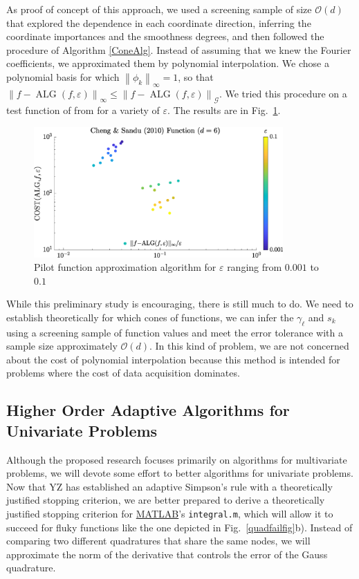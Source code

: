 \documentclass[11pt]{NSFamsart}
\newcommand{\MATLAB}{\hyperlink{MATLABlink}{MATLAB}\xspace}
\DeclareMathOperator{\ALG}{ALG}
\newcommand{\calg}{{\mathcal{G}}}
\newcommand{\norm}[2][{}]{\ensuremath{\left \lVert #2 \right \rVert}_{#1}}
\newcommand{\Order}{\mathcal{O}}
\begin{document}
As proof of concept of this approach, we used a screening sample of size $\Order(d)$ that  explored the dependence in each coordinate direction, inferring the coordinate importances and the smoothness degrees, and then followed the procedure of Algorithm \ref{ConeAlg}.  Instead of assuming that we knew the Fourier coefficients, we approximated them by polynomial interpolation.  We chose a polynomial basis for which $\norm[\infty]{\phi_k} = 1$, so that $\norm[\infty]{f - \ALG(f,\varepsilon)} \le \norm[\calg]{f - \ALG(f,\varepsilon)}$.  We tried this procedure on a test function of \cite{ChenSan10a} from \cite{VirLib17a} for a variety of $\varepsilon$.  The results are in Fig.\ \ref{fig:ChengSand}.

\begin{figure}
    \centering
    \includegraphics[height = 5cm]{ProgramsImages/sim_eval_results_chsan10_d6_sflg1ErrN.eps}
    \caption{Pilot function approximation algorithm for $\varepsilon$ ranging from $0.001$ to $0.1$}
    \label{fig:ChengSand}
\end{figure}

While this preliminary study is encouraging, there is  still much to do.  We need to establish theoretically for which cones of functions, we can infer the $\gamma_{\ell}$ and $s_k$ using a screening sample of function values and meet the error tolerance with a sample size approximately $\Order(d)$.  In this kind of problem, we are not concerned about the cost of polynomial interpolation because this method is intended for problems where the cost of data acquisition dominates.

\subsection{Higher Order Adaptive Algorithms for Univariate Problems}\label{SectUniProb}

Although the proposed research focuses primarily on algorithms for multivariate problems, we will devote some effort to better algorithms for univariate problems.  Now that YZ has established an adaptive Simpson's rule with a theoretically justified stopping criterion, we are better prepared to derive a theoretically justified stopping criterion for \MATLAB's 
\texttt{integral.m}, which will allow it to succeed for fluky functions like the one depicted in Fig.\ \ref{quadfailfig}b).  Instead of comparing two different quadratures that share the same nodes, we will approximate the norm of the derivative that controls the error of the Gauss quadrature.
\end{document}

